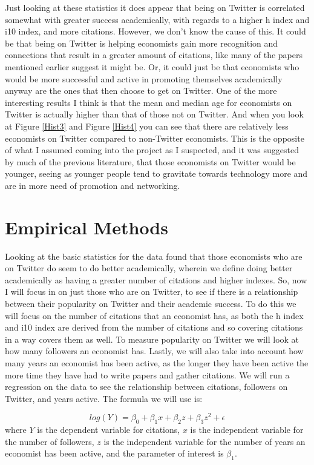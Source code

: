 \documentclass[12pt, Times New Roman]{article}
\begin{document}
Just looking at these statistics it does appear that being on Twitter is correlated somewhat with greater success academically, with regards to a higher h index and i10 index, and more citations. However, we don’t know the cause of this. It could be that being on Twitter is helping economists gain more recognition and connections that result in a greater amount of citations, like many of the papers mentioned earlier suggest it might be. Or, it could just be that economists who would be more successful and active in promoting themselves academically anyway are the ones that then choose to get on Twitter. 
\newpage
One of the more interesting results I think is that the mean and median age for economists on Twitter is actually higher than that of those not on Twitter. And when you look at Figure \ref{Hist3} and Figure \ref{Hist4} you can see that there are relatively less economists on Twitter compared to non-Twitter economists. This is the opposite of what I assumed coming into the project as I suspected, and it was suggested by much of the previous literature, that those economists on Twitter would be younger, seeing as younger people tend to gravitate towards technology more and are in more need of promotion and networking.

\section*{Empirical Methods}\label{sec:methods}

Looking at the basic statistics for the data found that those economists who are on Twitter do seem to do better academically, wherein we define doing better academically as having a greater number of citations and higher indexes. So, now I will focus in on just those who are on Twitter, to see if there is a relationship between their popularity on Twitter and their academic success. To do this we will focus on the number of citations that an economist has, as both the h index and i10 index are derived from the number of citations and so covering citations in a way covers them as well. To measure popularity on Twitter we will look at how many followers an economist has. Lastly, we will also take into account how many years an economist has been active, as the longer they have been active the more time they have had to write papers and gather citations.
\newpage
We will run a regression on the data to see the relationship between citations, followers on Twitter, and years active. The formula we will use is:

\begin{equation}
log(Y) = \beta_0 + \beta_1x + \beta_2z + \beta_3z^2 + \epsilon
 \end{equation} 
where $Y$ is the dependent variable for citations, $x$ is the independent variable for the number of followers, $z$ is the independent variable for the number of years an economist has been active, and the parameter of interest is $\beta_1$.
\end{document}
